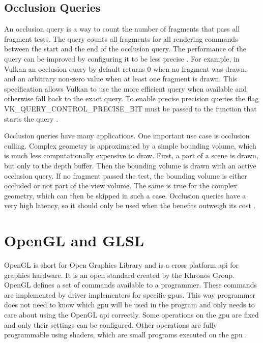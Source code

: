 \subsection{Occlusion Queries}
An occlusion query is a way to count the number of fragments that pass all fragment tests. The query counts all fragments for all rendering commands between the start and the end of the occlusion query. The performance of the query can be improved by configuring it to be less precise \cite{akine:2018:realtime}. For example, in Vulkan an occlusion query by default returns 0 when no fragment was drawn, and an arbitrary non-zero value when at least one fragment is drawn. This specification allows Vulkan to use the more efficient query when available and otherwise fall back to the exact query. To enable precise precision queries the flag VK\_QUERY\_CONTROL\_PRECISE\_BIT must be passed to the function that starts the query \cite{khronos:vulkan:spec1.1}.

Occlusion queries have many applications. One important use case is occlusion culling. Complex geometry is approximated by a simple bounding volume, which is much less computationally expensive to draw. First, a part of a scene is drawn, but only to the depth buffer. Then the bounding volume is drawn with an active occlusion query. If no fragment passed the test, the bounding volume is either occluded or not part of the view volume. The same is true for the complex geometry, which can then be skipped in such a case. Occlusion queries have a very high latency, so it should only be used when the benefits outweigh its cost   \cite{akine:2018:realtime, sellers:vulkanprogramming}.

\section{OpenGL and GLSL}
OpenGL is short for Open Graphics Library and is a cross platform \gls{api} for graphics hardware. It is an open standard created by the Khronos Group. OpenGL defines a set of commands available to a programmer. These commands are implemented by driver implementers for specific \glspl{gpu}. This way programmer does not need to know which \gls{gpu} will be used in the program and only needs to care about using the OpenGL \gls{api} correctly. Some operations on the \gls{gpu} are fixed and only their settings can be configured. Other operations are fully programmable using shaders, which are small programs executed on the \gls{gpu} \cite{khronos:glsl4.60:spec}.

